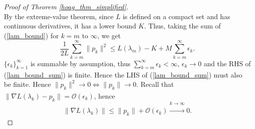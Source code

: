 \documentclass[11pt, twoside]{report}
\begin{document}
\begin{proof}[Proof of Theorem \ref{hoag_thm_simplified}]
\begin{equation}
\end{equation}
By the extreme-value theorem, since $L$ is defined on a compact set and has continuous derivatives, it has a lower bound $K$. Thus, taking the sum of (\ref{lam_bound}) for $k = m$ to $\infty$, we get
\begin{equation} \label{lam_bound_sum}
   \frac{1}{2L}\sum_{k=m}^\infty \|p_k\|^2 \leq L(\lambda_m) - K + M\sum_{k=m}^\infty \epsilon_k.
\end{equation}
$\{\epsilon_k\}_{k=1}^\infty$ is summable by assumption, thus $\sum_{k=m}^\infty \epsilon_k < \infty$, $\epsilon_k \xrightarrow[]{} 0$ and the RHS of (\ref{lam_bound_sum}) is finite. Hence the LHS of (\ref{lam_bound_sum}) must also be finite. Hence $\|p_k\|^2 \xrightarrow[]{} 0 \iff \|p_k\| \xrightarrow[]{} 0.$ Recall that $\|\nabla L(\lambda_k) - p_k\| = \mathcal{O}(\epsilon_k)$, hence 
\[\|\nabla L(\lambda_k)\| \leq \|p_k\| + \mathcal{O}(\epsilon_k) \xrightarrow[]{k \xrightarrow[]{} \infty} 0.\]

\end{proof}
\end{document}

